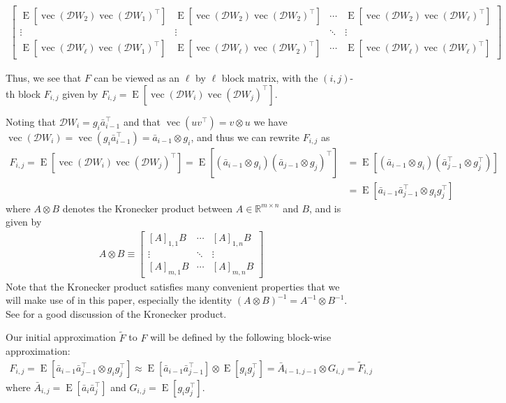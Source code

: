 \documentclass[12pt]{article}
\newcommand{\expected}{\operatorname{E}}
\newcommand{\ovec}{\operatorname{vec}}
\newcommand{\deriv}{\mathcal{D}}
\newcommand{\Real}{\mathbb{R}}
\begin{document}
\begin{align*}
\begin{bmatrix}
\expected \left[ \ovec(\deriv W_2) \ovec(\deriv W_1)^\top \right ]     &  \expected \left[ \ovec(\deriv W_2) \ovec(\deriv W_2)^\top \right ]    & \cdots   &   \expected \left[ \ovec(\deriv W_2) \ovec(\deriv W_\ell)^\top \right ] \\
\vdots      &  \vdots     & \ddots & \vdots  \\
\expected \left[ \ovec(\deriv W_\ell) \ovec(\deriv W_1)^\top \right ]   &   \expected \left[ \ovec(\deriv W_\ell) \ovec(\deriv W_2)^\top \right ]    & \cdots &  \expected \left[ \ovec(\deriv W_\ell) \ovec(\deriv W_\ell)^\top \right ]
\end{bmatrix}
\end{align*}

Thus, we see that $F$ can be viewed as an $\ell$ by $\ell$ block matrix, with the $(i,j)$-th block $F_{i,j}$ given by $F_{i,j} = \expected \left[ \ovec(\deriv W_i) \ovec(\deriv W_j)^\top \right ]$.

Noting that $\deriv W_i = g_i \bar{a}_{i-1}^\top$ and that $\ovec( u v^\top ) = v \otimes u$ we have $\ovec(\deriv W_i) = \ovec(g_i \bar{a}_{i-1}^\top) = \bar{a}_{i-1} \otimes g_i$, and thus we can rewrite $F_{i,j}$ as
\begin{align*}
F_{i,j} = \expected \left[ \ovec(\deriv W_i) \ovec(\deriv W_j)^\top \right ] = \expected \left[(\bar{a}_{i-1} \otimes g_i)(\bar{a}_{j-1} \otimes g_j)^\top \right ] &= \expected \left[(\bar{a}_{i-1} \otimes g_i)(\bar{a}_{j-1}^\top \otimes g_j^\top) \right ] \\
&= \expected \left[ \bar{a}_{i-1} \bar{a}_{j-1}^\top \otimes g_i g_j^\top \right ]
\end{align*}
where $A \otimes B$ denotes the Kronecker product between $A \in \Real^{m \times n}$ and $B$, and is given by
\begin{align*}
A\otimes B \equiv \begin{bmatrix} [A]_{1,1} B & \cdots & [A]_{1,n}B \\ \vdots & \ddots & \vdots \\ [A]_{m,1} B & \cdots & [A]_{m,n} B \end{bmatrix}
\end{align*}
Note that the Kronecker product satisfies many convenient properties that we will make use of in this paper, especially the identity $(A\otimes B)^{-1} = A^{-1}\otimes B^{-1}$.  See \citet{kronprod} for a good discussion of the Kronecker product.


Our initial approximation $\tilde{F}$ to $F$ will be defined by the following block-wise approximation:
\begin{align}
\label{eqn:kron_approx}
F_{i,j} = \expected \left[ \bar{a}_{i-1} \bar{a}_{j-1}^\top \otimes g_i g_j^\top \right] \approx \expected \left[ \bar{a}_{i-1} \bar{a}_{j-1}^\top \right] \otimes \expected \left[ g_i g_j^\top \right] = \bar{A}_{i-1,j-1} \otimes G_{i,j} = \tilde{F}_{i,j}
\end{align}
where $\bar{A}_{i,j} = \expected \left[ \bar{a}_i \bar{a}_j^\top \right]$ and $G_{i,j} = \expected \left[ g_i g_j^\top \right]$.
\end{document}
